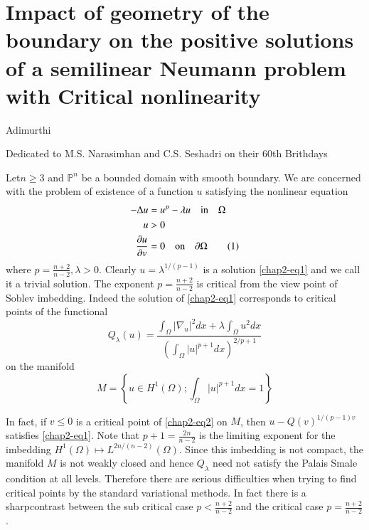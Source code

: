 \chapter{Impact of geometry of the boundary on the positive solutions of a semilinear Neumann problem with Critical nonlinearity}\label{chap2}

\begin{center}
{\large Adimurthi}

\medskip
Dedicated to M.S. Narasimhan and C.S. Seshadri on their 60th Brithdays
\end{center}

Let\pageoriginale $n\geq3$ and $\mathbb{P}^{n}$ be a bounded domain with smooth boundary. We are concerned with the problem
of existence of a function $u$ satisfying the nonlinear equation
\begin{align*}
-\Delta u &= u^{p}-\lambda u \quad{\rm in}\quad \Omega \nonumber\\
u &> 0 \nonumber\\
\dfrac{\partial u}{\partial v} &= 0 \quad {\rm on}\quad \partial \Omega\tag{1} \label{chap2-eq1} 
\end{align*}
where $p=\frac{n+2}{n-2},\lambda > 0$. Clearly $u=\lambda^{1/(p-1)}$ is a solution \eqref{chap2-eq1} and we call it a trivial solution. The exponent $p=\frac{n+2}{n-2}$ is critical from the view point of Soblev imbedding. Indeed the solution of \eqref{chap2-eq1} corresponds to critical points of the functional
\begin{equation*}
Q_{\lambda}(u) = \dfrac{\int_{\Omega}|\nabla_{u}|^{2}dx + \lambda\int_{\Omega}u^{2}dx}{\left(\int_{\Omega}|u|^{p+1}dx\right)^{2/p+1}}\tag{2}\label{chap2-eq2}
\end{equation*}
on the manifold
\begin{equation*}
M =\left\{u\in H^{1} (\Omega) ; \int_{\Omega}|u|^{p+1}dx=1\right\}\tag{3}\label{chap2-eq3}
\end{equation*}

In fact, if $v\leq 0$ is a critical point of \eqref{chap2-eq2} on $M$, then $u-Q(v)^{1/(p-1)v}$ satisfies \eqref{chap2-eq1}. Note that $p+1 =\frac{2n}{n-2}$ is the limiting exponent for the imbedding $H^{1}(\Omega)\mapsto L^{2n/(n-2)}(\Omega)$. Since this imbedding is not compact, the manifold $M$ is not weakly closed and hence $Q_{\lambda}$ need not satisfy the Palais Smale condition at all levels. Therefore there are serious difficulties when trying to find critical points by the standard variational methods. In fact there is a sharp\pageoriginale contrast between the sub critical case $p<\frac{n+2}{n-2}$ and the critical case $p=\frac{n+2}{n-2}$.
  
